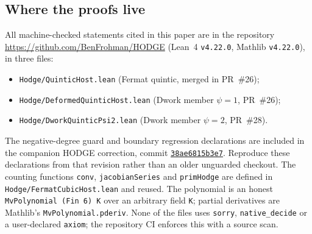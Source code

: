 \documentclass[11pt]{article}
\theoremstyle{definition}\newtheorem{definition}[theorem]{Definition}\newtheorem{remark}[theorem]{Remark}
\begin{document}
\subsection{Where the proofs live}
All machine-checked statements cited in this paper are in the repository
\url{https://github.com/BenFrohman/HODGE} (Lean~4 \texttt{v4.22.0}, Mathlib \texttt{v4.22.0}), in three files:
\begin{itemize}
\item \texttt{Hodge/QuinticHost.lean} (Fermat quintic, merged in PR~\#26);
\item \texttt{Hodge/DeformedQuinticHost.lean} (Dwork member $\psi=1$, PR~\#26);
\item \texttt{Hodge/DworkQuinticPsi2.lean} (Dwork member $\psi=2$, PR~\#28).
\end{itemize}
The negative-degree guard and boundary regression declarations are included in the companion
HODGE correction, commit \href{https://github.com/BenFrohman/HODGE/commit/38ae6815b3e76dfa39dae10c7a67b0f057a3d721}{\texttt{38ae6815b3e7}}. Reproduce these declarations from that revision rather than an older unguarded checkout.
The counting functions \texttt{conv}, \texttt{jacobianSeries} and \texttt{primHodge} are defined in
\texttt{Hodge/FermatCubicHost.lean} and reused. The polynomial is an honest
\texttt{MvPolynomial (Fin 6) K} over an arbitrary field \texttt{K}; partial derivatives are Mathlib's
\texttt{MvPolynomial.pderiv}. None of the files uses \texttt{sorry}, \texttt{native\_decide} or a
user-declared \texttt{axiom}; the repository CI enforces this with a source scan.
\end{document}
